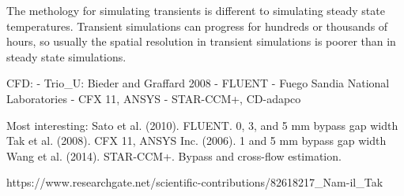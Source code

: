 The methology for simulating transients is different to simulating steady state temperatures.
Transient simulations can progress for hundreds or thousands of hours, so usually the spatial resolution in transient simulations is poorer than in steady state simulations.

CFD:
- Trio_U: Bieder and Graffard 2008 %
- FLUENT
- Fuego Sandia National Laboratories
- CFX 11, ANSYS
- STAR-CCM+, CD-adapco

Most interesting:
Sato et al. (2010). FLUENT.  0, 3, and 5 mm bypass gap width
Tak et al. (2008). CFX 11, ANSYS Inc. (2006). 1 and 5 mm bypass gap width
Wang et al. (2014). STAR-CCM+. Bypass and cross-flow estimation.



% 
https://www.researchgate.net/scientific-contributions/82618217_Nam-il_Tak




